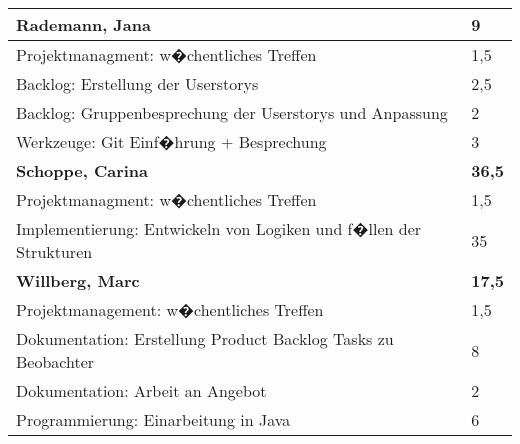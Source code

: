 \documentclass[a4paper,11pt]{scrartcl}
\begin{document}
\begin{longtable}{| p{13.8cm} | C{2.4cm} |}
	\textbf{Rademann, Jana} & \textbf{9}\\ %
	\hline

  Projektmanagment: w�chentliches Treffen
	&
  1,5
	\\
	\hline

  Backlog: Erstellung der Userstorys
	&
  2,5
	\\
	\hline

  Backlog: Gruppenbesprechung der Userstorys und Anpassung
	&
  2
	\\
	\hline

  Werkzeuge: Git Einf�hrung + Besprechung
	&
  3
	\\
	\hline
	\hline


	\textbf{Schoppe, Carina} & \textbf{36,5}\\ %
	\hline

  Projektmanagment: w�chentliches Treffen
	&
  1,5
	\\
	\hline

  Implementierung: Entwickeln von Logiken und f�llen der Strukturen
	&
  35
	\\
	\hline
	\hline


	\textbf{Willberg, Marc} & \textbf{17,5}\\ %
	\hline

  Projektmanagement: w�chentliches Treffen
	&
  1,5
	\\
	\hline

  Dokumentation: Erstellung Product Backlog Tasks zu Beobachter
	&
  8
	\\
	\hline

  Dokumentation: Arbeit an Angebot
	&
  2
	\\
	\hline

  Programmierung: Einarbeitung in Java
	&
  6
	\\
	\hline

\end{longtable}
\end{document}
